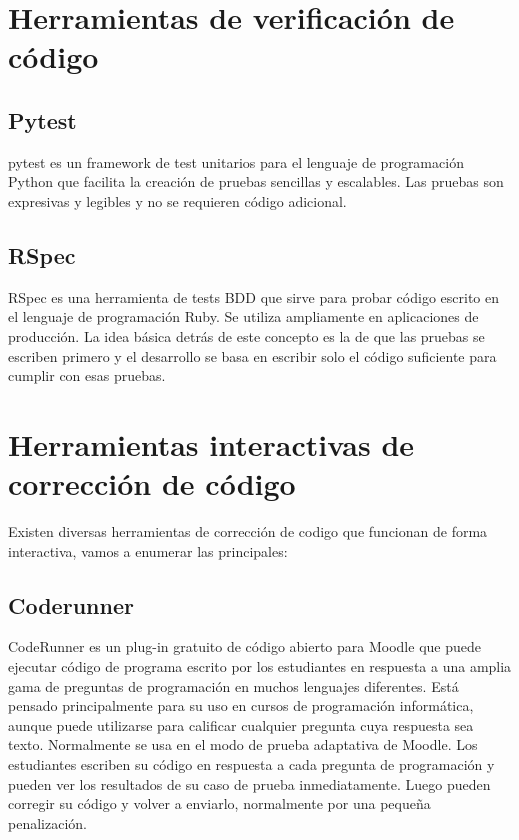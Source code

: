 \section {Herramientas de verificación de código}

\subsection {Pytest}

pytest es un framework de test unitarios para el lenguaje de programación Python que facilita la creación de pruebas sencillas y escalables. Las pruebas son expresivas y legibles y no se requieren código adicional.

\subsection {RSpec}

RSpec es una herramienta de tests BDD que sirve para probar código escrito en el lenguaje de programación Ruby. Se utiliza ampliamente en aplicaciones de producción. La idea básica detrás de este concepto es la de que las pruebas se escriben primero y el desarrollo se basa en escribir solo el código suficiente para cumplir con esas pruebas.



\section {Herramientas interactivas de corrección de código}

Existen diversas herramientas de corrección de codigo que funcionan de forma interactiva, vamos a enumerar las principales:

\subsection {Coderunner}

CodeRunner es un plug-in gratuito de código abierto para Moodle que puede ejecutar código de programa escrito por los estudiantes en respuesta a una amplia gama de preguntas de programación en muchos lenguajes diferentes. Está pensado principalmente para su uso en cursos de programación informática, aunque puede utilizarse para calificar cualquier pregunta cuya respuesta sea texto. Normalmente se usa en el modo de prueba adaptativa de Moodle. Los estudiantes escriben su código en respuesta a cada pregunta de programación y pueden ver los resultados de su caso de prueba inmediatamente. Luego pueden corregir su código y volver a enviarlo, normalmente por una pequeña penalización.

